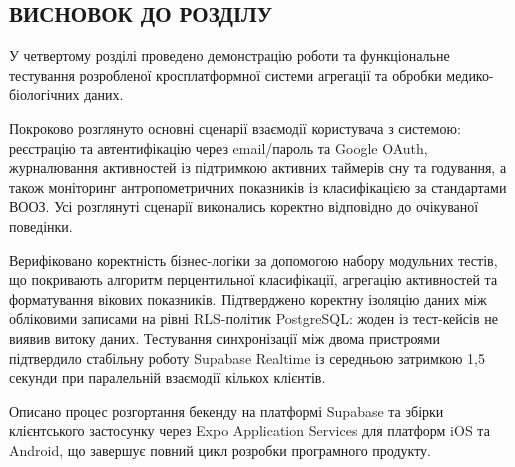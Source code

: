 \begin{conclusionsection}

\section{ВИСНОВОК ДО РОЗДІЛУ}

У четвертому розділі проведено демонстрацію роботи та функціональне тестування розробленої кросплатформної системи агрегації та обробки медико-біологічних даних.

Покроково розглянуто основні сценарії взаємодії користувача з системою: реєстрацію та автентифікацію через email/пароль та Google \gls{OAuth}, журналювання активностей із підтримкою активних таймерів сну та годування, а також моніторинг антропометричних показників із класифікацією за стандартами \gls{ВООЗ}. Усі розглянуті сценарії виконались коректно відповідно до очікуваної поведінки.

Верифіковано коректність бізнес-логіки за допомогою набору модульних тестів, що покривають алгоритм перцентильної класифікації, агрегацію активностей та форматування вікових показників. Підтверджено коректну ізоляцію даних між обліковими записами на рівні \gls{RLS}-політик PostgreSQL: жоден із тест-кейсів не виявив витоку даних. Тестування синхронізації між двома пристроями підтвердило стабільну роботу Supabase Realtime із середньою затримкою 1,5 секунди при паралельній взаємодії кількох клієнтів.

Описано процес розгортання бекенду на платформі Supabase та збірки клієнтського застосунку через Expo Application Services для платформ iOS та Android, що завершує повний цикл розробки програмного продукту.

\end{conclusionsection}
